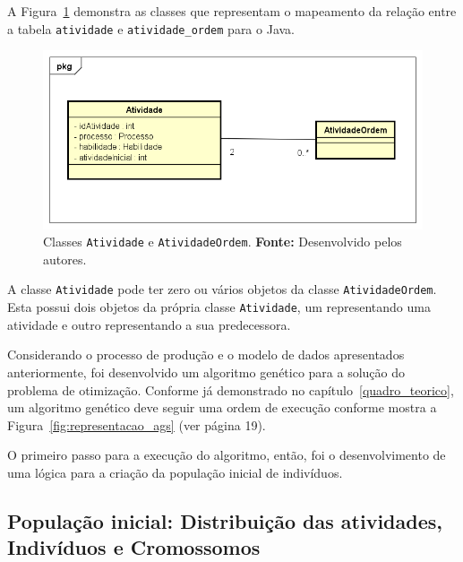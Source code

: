 \par A Figura~\ref{fig:class_atividadeOrdem} demonstra as classes que representam o mapeamento da relação
entre a tabela \texttt{atividade} e \texttt{atividade\_ordem} para o Java.

\newpage

\begin{figure}[h!]
	\centerline{\includegraphics[scale=0.7]{./imagens/atividade_diagram.png}}
	\caption[Classes \texttt{Atividade} e \texttt{AtividadeOrdem}.]
	{Classes \texttt{Atividade} e \texttt{AtividadeOrdem}. \textbf{Fonte:}
	Desenvolvido pelos autores.}
	\label{fig:class_atividadeOrdem}
\end{figure} 

\par A classe \texttt{Atividade} pode ter zero ou vários objetos da classe
\texttt{AtividadeOrdem}.
Esta possui dois objetos da própria classe \texttt{Atividade}, um representando uma
atividade e outro representando a sua predecessora.

\par Considerando o processo de produção e o modelo de dados apresentados anteriormente, foi
desenvolvido um algoritmo genético para a solução do problema de otimização. Conforme já demonstrado 
no capítulo~\ref{quadro_teorico}, um algoritmo genético deve seguir uma ordem de execução conforme mostra
a Figura~\ref{fig:representacao_ags} (ver página 19).

\par O primeiro passo para a execução do algoritmo, então, foi o desenvolvimento de uma lógica para a criação
da população inicial de indivíduos.

\subsection {População inicial: Distribuição das atividades, Indivíduos e Cromossomos} \label{populacao_inicial_section}

